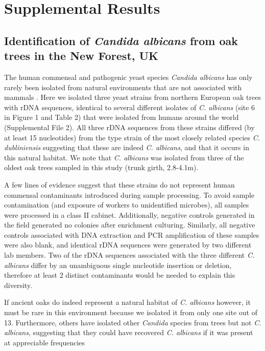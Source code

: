 \documentclass[12pt]{article}
\begin{document}
\section*{Supplemental Results}
\label{sec:Supplemental Results}

\subsection*{Identification of \textit{Candida albicans} from oak trees in the New Forest, UK}
\doublespacing

The human commensal and pathogenic yeast species \textit{Candida albicans} has only rarely been isolated from natural environments that are not associated with mammals \citep{tanghe_aquaporin_2005,lachance_chapter_2011-5,maganti_ecological_2011}. Here we isolated three yeast strains from northern European oak trees with rDNA sequences, identical to several different isolates of \textit{C. albicans} (site 6 in Figure 1 and Table 2) that were isolated from humans around the world (Supplemental File 2). All three rDNA sequences from these strains differed (by at least 15 nucleotides) from the type strain of the most closely related species \textit{C. dubliniensis} \citep{lachance_chapter_2011-5} suggesting that these are indeed \textit{C. albicans}, and that it occurs in this natural habitat. We note that \textit{C. albicans} was isolated from three of the oldest oak trees sampled in this study (trunk girth, 2.8-4.1m). 

A few lines of evidence suggest that these strains do not represent human commensal contaminants introduced  during sample processing. To avoid sample contamination (and exposure of workers to unidentified microbes), all samples were processed in a class II cabinet. Additionally, negative controls generated in the field generated no colonies after enrichment culturing. Similarly, all negative controls associated with DNA extraction and PCR amplification of these samples were also blank, and identical rDNA sequences were generated by two different lab members. Two of the rDNA sequences associated with the three different \textit{C. albicans} differ by an unambiguous single nucleotide insertion or deletion, therefore at least 2 distinct contaminants would be needed to explain this diversity.

If ancient oaks do indeed represent a natural habitat of \textit{C. albicans} however, it must be rare in this environment because we isolated it from only one site out of 13. Furthermore, others have isolated other \textit{Candida} species from trees but not \textit{C. albicans}, suggesting that they could have recovered \textit{C. albicans} if it was present at appreciable frequencies \citep{maganti_ecological_2011,charron_exploring_2014,sylvester_temperature_2015}
\end{document}
